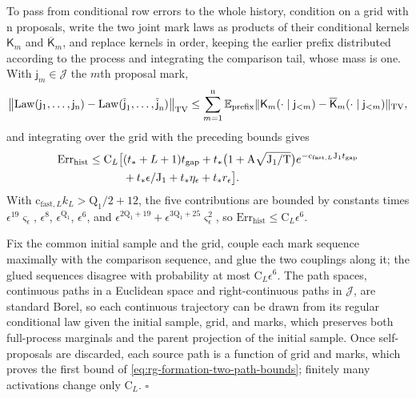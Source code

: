 To pass from conditional row errors to the whole history, condition on a grid
with \(\mathrm n\) proposals, write the two joint mark laws as products of
their conditional kernels \(\mathsf K_m\) and \(\overline{\mathsf K}_m\), and
replace kernels in order, keeping the earlier prefix distributed according to
the process and integrating the comparison tail, whose mass is one. With
\(\mathsf j_m\in\mathcal J\) the \(m\)th proposal mark,
\begin{equation}
 \bigl\|\operatorname{Law}(\mathsf j_1,\ldots,\mathsf j_{\mathrm n})
          -\operatorname{Law}(\overline{\mathsf j}_1,\ldots,\overline{\mathsf j}_{\mathrm n})\bigr\|_{\mathrm{TV}}
 \le \sum_{m=1}^{\mathrm n}
       \mathbb E_{\text{prefix}}
       \|\mathsf K_m(\cdot\mid\mathsf j_{<m})
                 -\overline{\mathsf K}_m(\cdot\mid\mathsf j_{<m})\|_{\mathrm{TV}},
 \label{eq:rg-formation-history-telescoping}
\end{equation}
and integrating over the grid with the preceding bounds gives
\begin{align}
 \mathrm{Err}_{\mathrm{hist}}\le \mathrm C_L\big[
 &(t_*+L+1)t_{\mathrm{gap}}
 +t_*\bigl(1+\mathrm A\sqrt{\mathrm J_1/\mathrm T}\bigr)
                      e^{-\mathrm c_{\mathrm{fast},L}\mathrm J_1t_{\mathrm{gap}}}
 \notag\\
 &+t_*\epsilon/\mathrm J_1
       +t_*\eta_\epsilon+t_*r_\epsilon\big].
 \label{eq:rg-formation-full-history-error}
\end{align}
With \(\mathrm c_{\mathrm{fast},L}k_L>\mathrm Q_1/2+12\), the five contributions
are bounded by constants times \(\epsilon^{19}\varsigma_\epsilon\),
\(\epsilon^8\), \(\epsilon^{\mathrm Q_1}\), \(\epsilon^6\), and
\(\epsilon^{2\mathrm Q_1+19}+\epsilon^{3\mathrm Q_1+25}\varsigma_\epsilon^2\), so
\(\mathrm{Err}_{\mathrm{hist}}\le\mathrm C_L\epsilon^6\).

Fix the common initial sample and the grid, couple each mark sequence
maximally with the comparison sequence, and glue the two couplings along it;
the glued sequences disagree with probability at most
\(\mathrm C_L\epsilon^6\). The path spaces, continuous paths in a Euclidean
space and right-continuous paths in \(\mathcal J\), are standard Borel, so each
continuous trajectory can be drawn from its regular conditional law given the
initial sample, grid, and marks, which preserves both full-process marginals
and the parent projection of the initial sample. Once self-proposals are
discarded, each source path is a function of grid and marks, which proves the
first bound of \cref{eq:rg-formation-two-path-bounds}; finitely many
activations change only \(\mathrm C_L\). \hfill\(\square\)

